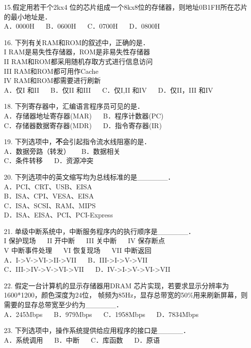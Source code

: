 15.假定用若干个2kx4 位的芯片组成一个8kx8位的存储器，则地址0B1FH所在芯片的最小地址是． \\
A．0000H $\quad$ B．0600H $\quad$ C．0700H $\quad$ D．0800H

16. 下列有关RAM和ROM的叙述中，正确的是． \\
I RAM是易失性存储器，ROM是非易失性存储器 \\
II RAM和ROM都采用随机存取方式进行信息访问 \\
III RAM和ROM都可用作Cache \\
IV RAM和ROM都需要进行刷新 \\
A．仅I 和II $\quad$ B．仅II 和III $\quad$ C．仅I,II 和IV $\quad$ D．仅II，III 和IV

18. 下列寄存器中，汇编语言程序员可见的是． \\
A．存储器地址寄存器(MAR) $\quad$ B．程序计数器(PC) \\
C．存储器数据寄存器(MDR) $\quad$ D．指令寄存器(IR)

19. 下列选项中，\textbf{不}会引起指令流水线阻塞的是． \\
A．数据旁路（转发） $\quad$ B．数据相关 \\
C．条件转移 $\quad$ D．资源冲突

20. 下列选项中的英文缩写均为总线标准的是______． \\
A．PCI、CRT、USB、EISA \\
B．ISA、CPI、VESA、EISA \\
C．ISA、SCSI、RAM、MIPS \\
D．ISA、EISA、PCI、PCI-Express

21. 单级中断系统中，中断服务程序内的执行顺序是______． \\
I 保护现场 $\quad$ II 开中断 $\quad$ III 关中断 $\quad$ IV 保存断点 \\
V 中断事件处理 $\quad$ VI 恢复现场 $\quad$ VII 中断返回 \\
A．I->V->VI->II->VII $\quad$ B．III->I->V->VII \\
C．III->IV->V->VI->VII $\quad$ D．IV->I->V->VI->VII

22. 假定一台计算机的显示存储器用DRAM 芯片实现，若要求显示分辨率为1600*1200，颜色深度为24位，
帧频为85Hz，显存总带宽的50\%用来刷新屏幕，则需要的显存总带宽至少约为______． \\
A．245Mbps $\quad$ B．979Mbps $\quad$ C．1958Mbps $\quad$ D．7834Mbps

23. 下列选项中，操作系统提供给应用程序的接口是_____． \\
A．系统调用 $\quad$ B．中断 $\quad$ C．库函数 $\quad$ D．原语

